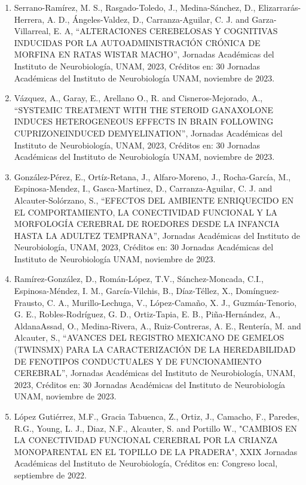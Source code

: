 \begin{enumerate}
\item Serrano-Ramírez, M. S., Rasgado-Toledo, J., Medina-Sánchez, D., Elizarrarás-Herrera, A. D., Ángeles-Valdez, D., 
Carranza-Aguilar, C. J. and Garza-Villarreal, E. A, “ALTERACIONES CEREBELOSAS Y COGNITIVAS INDUCIDAS POR LA 
AUTOADMINISTRACIÓN CRÓNICA DE MORFINA EN RATAS WISTAR MACHO”, Jornadas Académicas del Instituto de Neurobiología, UNAM, 
2023, Créditos en: 30 Jornadas Académicas del Instituto de Neurobiología UNAM, noviembre de 2023.

\item Vázquez, A., Garay, E., Arellano O., R. and Cisneros-Mejorado, A., “SYSTEMIC TREATMENT WITH THE STEROID 
GANAXOLONE INDUCES HETEROGENEOUS EFFECTS IN BRAIN FOLLOWING CUPRIZONEINDUCED DEMYELINATION”, Jornadas Académicas del 
Instituto de Neurobiología, UNAM, 2023, Créditos en: 30 Jornadas Académicas del Instituto de Neurobiología UNAM, noviembre 
de 2023.

\item González-Pérez, E., Ortíz-Retana, J., Alfaro-Moreno, J., Rocha-García, M., Espinosa-Mendez, I., Gasca-Martinez, D., 
Carranza-Aguilar, C. J. and Alcauter-Solórzano, S., “EFECTOS DEL AMBIENTE ENRIQUECIDO EN EL COMPORTAMIENTO, LA CONECTIVIDAD 
FUNCIONAL Y LA MORFOLOGÍA CEREBRAL DE ROEDORES DESDE LA INFANCIA HASTA LA ADULTEZ TEMPRANA”, Jornadas Académicas del 
Instituto de Neurobiología, UNAM, 2023, Créditos en: 30 Jornadas Académicas del Instituto de Neurobiología UNAM, noviembre 
de 2023.

\item Ramírez-González, D., Román-López, T.V., Sánchez-Moncada, C.I., Espinosa-Méndez, I. M., García-Vilchis, B., 
Díaz-Téllez, X., Domínguez-Frausto, C. A., Murillo-Lechuga, V., López-Camaño, X. J., Guzmán-Tenorio, G. E., 
Robles-Rodríguez, G. D., Ortiz-Tapia, E. B., Piña-Hernández, A., AldanaAssad, O., Medina-Rivera, A., Ruiz-Contreras, A. E., 
Rentería, M. and Alcauter, S., “AVANCES DEL REGISTRO MEXICANO DE GEMELOS (TWINSMX) PARA LA CARACTERIZACIÓN DE LA 
HEREDABILIDAD DE FENOTIPOS CONDUCTUALES Y DE FUNCIONAMIENTO CEREBRAL”, Jornadas Académicas del Instituto de Neurobiología, 
UNAM, 2023, Créditos en: 30 Jornadas Académicas del Instituto de Neurobiología UNAM, noviembre de 2023.

\item López Gutiérrez, M.F., Gracia Tabuenca, Z., Ortiz, J., Camacho, F., Paredes, R.G., Young, L. J., Diaz, N.F., Alcauter, 
S. and Portillo W., "CAMBIOS EN LA CONECTIVIDAD FUNCIONAL CEREBRAL POR LA CRIANZA MONOPARENTAL EN EL TOPILLO DE LA 
PRADERA", XXIX Jornadas Académicas del Instituto de Neurobiología, Créditos en: Congreso local, septiembre de 2022.


\end{enumerate}
